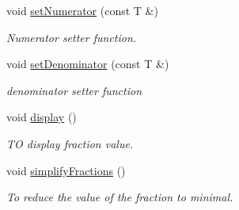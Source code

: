 \begin{DoxyCompactItemize}
void \hyperlink{classfraction_a2ab1807fd2d62646e10033fd161d239f}{set\+Numerator} (const T \&)
\begin{DoxyCompactList}\small\item\em Numerator setter function. \end{DoxyCompactList}\item 
void \hyperlink{classfraction_ac7753c1adda4d389178570718014d331}{set\+Denominator} (const T \&)
\begin{DoxyCompactList}\small\item\em denominator setter function \end{DoxyCompactList}\item 
void \hyperlink{classfraction_a9449f42f0fe675204aa66f930dc7f424}{display} ()
\begin{DoxyCompactList}\small\item\em TO display fraction value. \end{DoxyCompactList}\item 
void \hyperlink{classfraction_ad9cf1bb8fb5b761ed9bf3d47dd97af21}{simplify\+Fractions} ()
\begin{DoxyCompactList}\small\item\em To reduce the value of the fraction to minimal. \end{DoxyCompactList}\end{DoxyCompactItemize}
